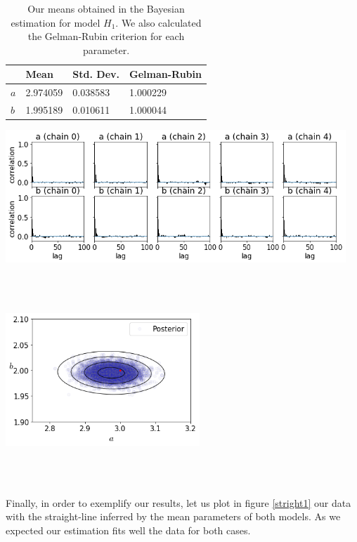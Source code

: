 \documentclass[onecolumn,           %
               showpacs,            %
               preprintnumbers,     %
               aps,                 %
               prl,          	    %
               letterpaper,             %
               superscriptaddress,      %
               nofootinbib,         %
               tightenlines,        %
               floats,floatfix      %
               ,usenatbib,
               ]{revtex4-1}
\begin{document}
\begin{table}[h!]
\centering
\begin{tabular}{||l|l|l|l||} 
 \hline
 & \textbf{Mean} & \textbf{Std. Dev.} & \textbf{Gelman-Rubin} \\ [0.5ex] 
 \hline\hline
$a$ & 2.974059 	 & 0.038583 & 1.000229 \\
\hline
$b$ & 1.995189 & 0.010611 	 & 1.000044\\ [1ex] 
 \hline
\end{tabular}
\caption{\footnotesize{Our means obtained in the Bayesian estimation for model $H_1$. We also calculated the Gelman-Rubin criterion for each parameter.}}
\label{tab}
\end{table}

\begin{minipage}{\textwidth}
\centering
\includegraphics[height=5cm]{Figures/autocorr_2.png}
\label{autocorr_2}
\end{minipage}
\\$ $

\begin{minipage}{\textwidth}
\centering
\includegraphics[height=5cm]{Figures/contour_2.png}
\label{contour_2}
\end{minipage}\\ $ $

Finally, in order to exemplify our results, let us plot in figure \ref{stright1} our data with the straight-line inferred by the mean parameters of both models. As we expected our estimation fits well the data for both cases.  
\end{document}
